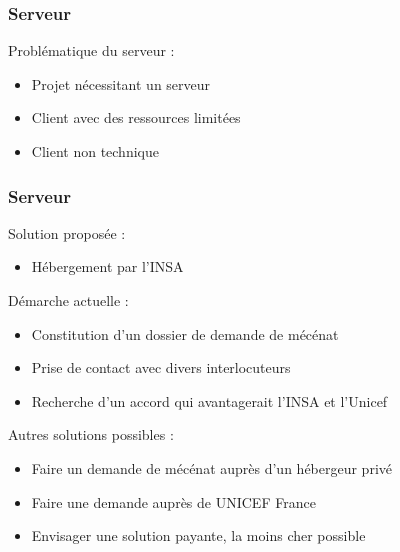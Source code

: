 \begin{frame}
	\frametitle{Serveur}

    Problématique du serveur :
      \begin{itemize}
        \item Projet nécessitant un serveur
        \item Client avec des ressources limitées
        \item Client non technique
      \end{itemize}
      
\end{frame}


\begin{frame}
	\frametitle{Serveur}
	Solution proposée :
	\begin{itemize}	
    \item Hébergement par l'INSA
    \end{itemize}
    Démarche actuelle :
      \begin{itemize}
        \item Constitution d'un dossier de demande de mécénat
        \item Prise de contact avec divers interlocuteurs
        \item Recherche d'un accord qui avantagerait l'INSA et l'Unicef
      \end{itemize}
    Autres solutions possibles :
      \begin{itemize}
        \item Faire un demande de mécénat auprès d'un hébergeur privé
        \item Faire une demande auprès de UNICEF France
        \item Envisager une solution payante, la moins cher possible
      \end{itemize}
\end{frame}